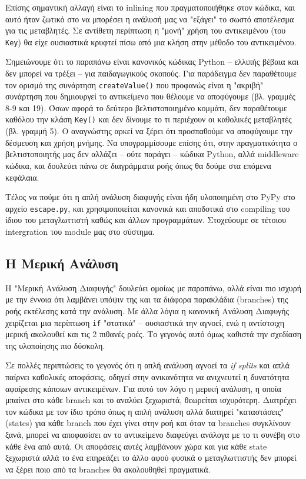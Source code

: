 Επίσης σημαντική αλλαγή είναι το inlining που πραγματοποιήθηκε στον κώδικα, και
αυτό ήταν ζωτικό στο να μπορέσει η ανάλυσή μας να "εξάγει" το σωστό αποτέλεσμα
για τις μεταβλητές. Σε αντίθετη περίπτωση η "μονή" χρήση του αντικειμένου (του
\texttt{Key}) θα είχε ουσιαστικά κρυφτεί πίσω από μια κλήση στην μέθοδο του
αντικειμένου.

Σημειώνουμε ότι  το παραπάνω είναι κανονικός κώδικας Python – ελλιπής βέβαια και
δεν μπορεί να τρέξει – για παιδαγωγικούς σκοπούς. Για παράδειγμα δεν παραθέτουμε
τον ορισμό της συνάρτηση \texttt{createValue()} που προφανώς είναι η "ακριβή"
συνάρτηση που δημιουργεί το αντικείμενο που θέλουμε να αποφύγουμε (βλ. γραμμές
8-9 και 19). Όσων αφορά το δεύτερο βελτιστοποιημένο κομμάτι, δεν παραθέτουμε
καθόλου την κλάση \texttt{Key()} και δεν δίνουμε το τι περιέχουν οι καθολικές
μεταβλητές (βλ. γραμμή 5). Ο αναγνώστης αρκεί να ξέρει ότι προσπαθούμε να
αποφύγουμε την δέσμευση και χρήση μνήμης. Να υπογραμμίσουμε επίσης ότι, στην
πραγματικότητα ο βελτιστοποιητής μας δεν αλλάζει – ούτε παράγει – κώδικα Python,
αλλά middleware κώδικα, και δουλεύει πάνω σε διαγράμματα ροής όπως θα δούμε στα
επόμενα κεφάλαια.

Τέλος να πούμε ότι η απλή ανάλυση διαφυγής είναι ήδη υλοποιημένη στο PyPy στο
αρχείο \texttt{escape.py}, και χρησιμοποιείται κανονικά και αποδοτικά στο
compiling του ίδιου του μεταγλωττιστή καθώς και άλλων προγραμμάτων. Στοχεύουμε
σε τέτοιου intergration του module μας στο σύστημα.


\subsection{Η Μερική Ανάλυση}

Η "Μερική Ανάλυση Διαφυγής" δουλεύει ομοίως με παραπάνω, αλλά είναι πιο ισχυρή
με την έννοια ότι λαμβάνει υπόψιν της και τα διάφορα παρακλάδια (branches) της
ροής εκτέλεσης κατά την ανάλυση. Με άλλα λόγια η κανονική Ανάλυση Διαφυγής
χειρίζεται μια περίπτωση \texttt{if} "στατικά" – ουσιαστικά την αγνοεί, ενώ η
αντίστοιχη μερική ακολουθεί και τις 2 πιθανές ροές. Το γεγονός αυτό όμως
καθιστά την σχεδίαση της υλοποίησης πιο δύσκολη.

Σε πολλές περιπτώσεις το γεγονός ότι η απλή ανάλυση αγνοεί τα \textit{if splits}
και απλά παίρνει καθολικές αποφάσεις, οδηγεί στην ανικανότητα να ανιχνευτεί η
δυνατότητα αφαίρεσης κάποιων αντικειμένων. Για αυτό τον λόγο η μερική ανάλυση, η
οποία μπαίνει στο κάθε branch και το αναλύει ξεχωριστά, θεωρείται ισχυρότερη.
Διατρέχει τον κώδικα με τον ίδιο τρόπο όπως η απλή ανάλυση αλλά διατηρεί
"καταστάσεις" (states) για κάθε branch που έχει γίνει στην ροή και όταν τα
branches συγκλίνουν ξανά, μπορεί να αποφασίσει αν το αντικείμενο διαφεύγει
ανάλογα με το τι συνέβη στο κάθε ένα από αυτά. Οι αποφάσεις αυτές λαμβάνουν χώρα
και για κάθε state ξεχωριστά αλλά το ένα επηρεάζει το άλλο αφού φυσικά ο
μεταγλωττιστής δεν μπορεί να ξέρει ποιο από τα branches θα ακολουθηθεί
πραγματικά.

